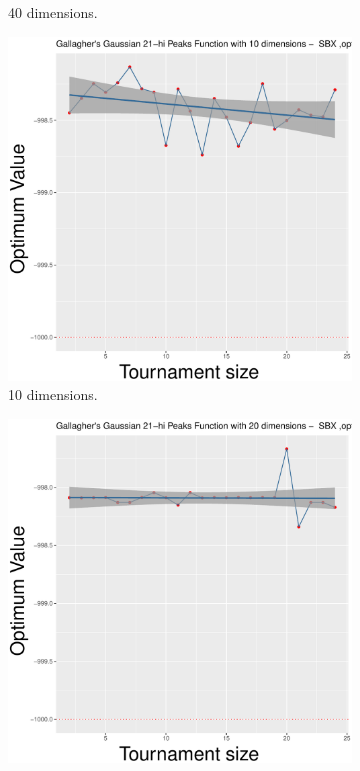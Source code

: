 \begin{figure}[t]
\begin{subfigure}[b]{0.33\textwidth}
		\caption{40 dimensions.}
	\end{subfigure}
	\caption{Average performance on different tournament size for the Gallagher's Gaussian 21-hi Peaks Function, when using the uniform crossover - ($\lambda, \lambda$) scheme.}
	\label{uniform-22-a}
	\begin{subfigure}[b]{0.33\textwidth}
		\centering
		\includegraphics[width=\textwidth]{img/2n2n-10D/multimodal_2n2n_22_dim_10.pdf}
		\caption{10 dimensions.}
	\end{subfigure}
	\begin{subfigure}[b]{0.33\textwidth}
		\centering
		\includegraphics[width=\textwidth]{img/2n2n-20D/multimodal_2n2n_22_dim_20.pdf}

\end{subfigure}
\end{figure}

